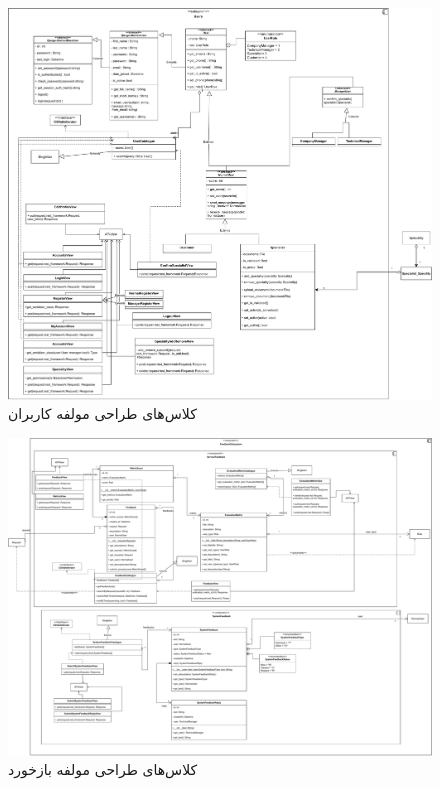 \eject \pdfpagewidth=15in \pdfpageheight=20in

\begin{figure}[ht!]
	\centering
	\includegraphics[scale=0.8]{figs/design-class/users.pdf}
	\caption{کلاس‌های طراحی مولفه کاربران}
\end{figure}
\FloatBarrier
\newpage


\eject \pdfpagewidth=18in \pdfpageheight=18in

\begin{figure}[ht!]
	\centering
	\includegraphics[scale=0.8]{figs/design-class/feedback.pdf}
	\caption{کلاس‌های طراحی مولفه بازخورد}
\end{figure}
\FloatBarrier
\newpage

